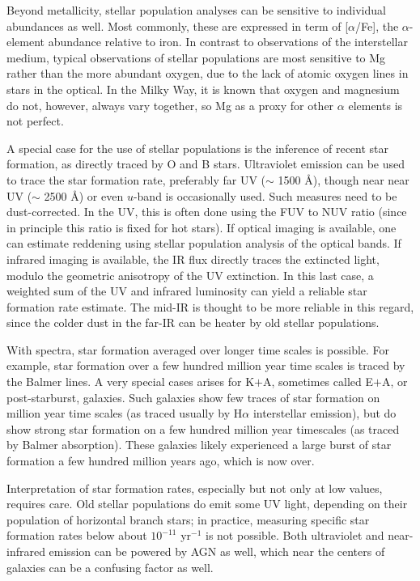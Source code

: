 Beyond metallicity, stellar population analyses can be sensitive to
individual abundances as well. Most commonly, these are expressed in
term of [$\alpha$/Fe], the $\alpha$-element abundance relative to
iron. In contrast to observations of the interstellar medium, typical
observations of stellar populations are most sensitive to Mg rather
than the more abundant oxygen, due to the lack of atomic oxygen lines
in stars in the optical. In the Milky Way, it is known that oxygen and
magnesium do not, however, always vary together, so Mg as a proxy for
other $\alpha$ elements is not perfect. 

A special case for the use of stellar populations is the inference of
recent star formation, as directly traced by O and B
stars. Ultraviolet emission can be used to trace the star formation
rate, preferably far UV ($\sim$ 1500 \AA), though near near UV ($\sim$
2500 \AA) or even $u$-band is occasionally used. Such measures need to
be dust-corrected. In the UV, this is often done using the FUV to NUV
ratio (since in principle this ratio is fixed for hot stars). If
optical imaging is available, one can estimate reddening using stellar
population analysis of the optical bands. If infrared imaging is
available, the IR flux directly traces the extincted light, modulo the
geometric anisotropy of the UV extinction. In this last case, a
weighted sum of the UV and infrared luminosity can yield a reliable
star formation rate estimate. The mid-IR is thought to be more
reliable in this regard, since the colder dust in the far-IR can be
heater by old stellar populations.

With spectra, star formation averaged over longer time scales is
possible. For example, star formation over a few hundred million year
time scales is traced by the Balmer lines.  A very special cases
arises for K$+$A, sometimes called E$+$A, or post-starburst,
galaxies. Such galaxies show few traces of star formation on million
year time scales (as traced usually by H$\alpha$ interstellar
emission), but do show strong star formation on a few hundred million
year timescales (as traced by Balmer absorption). These galaxies
likely experienced a large burst of star formation a few hundred
million years ago, which is now over.

Interpretation of star formation rates, especially but not only at low
values, requires care.  Old stellar populations do emit some UV light,
depending on their population of horizontal branch stars; in practice,
measuring specific star formation rates below about $10^{-11}$
yr$^{-1}$ is not possible.  Both ultraviolet and near-infrared
emission can be powered by AGN as well, which near the centers of
galaxies can be a confusing factor as well.

